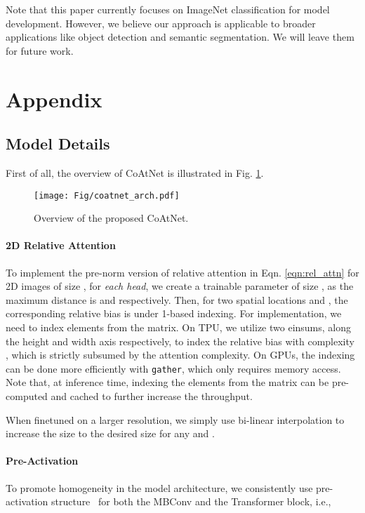 \documentclass{article}
\newcommand{\name}{CoAtNet\xspace}
\begin{document}
Note that this paper currently focuses on ImageNet classification for model development. 
However, we believe our approach is applicable to broader applications like object detection and semantic segmentation.
We will leave them for future work.

\clearpage


\clearpage

\appendix

\section{Appendix}
\label{sec:appendix}

\subsection{Model Details}
\label{sec:appendix_model_detail}
First of all, the overview of \name is illustrated in Fig. \ref{fig:overview}.
\begin{figure}[!ht]
    \centering
    \texttt{[image: Fig/coatnet\_arch.pdf]}
    \caption{Overview of the proposed \name.}
    \label{fig:overview}
\end{figure}
\paragraph{2D Relative Attention} To implement the pre-norm version of relative attention in Eqn. \ref{eqn:rel_attn} for 2D images of size , for \textit{each head}, we create a trainable parameter  of size , as the maximum distance is  and  respectively.
Then, for two spatial locations  and , the corresponding relative bias is  under 1-based indexing.
For implementation, we need to index  elements from the  matrix.
On TPU, we utilize two einsums, along the height and width axis respectively, to index the relative bias with complexity , which is strictly subsumed by the  attention complexity.
On GPUs, the indexing can be done more efficiently with \texttt{gather}, which only requires memory access.
Note that, at inference time, indexing the  elements from the  matrix can be pre-computed and cached to further increase the throughput.

When finetuned on a larger resolution, we simply use bi-linear interpolation to increase the size  to the desired size  for any  and .

\paragraph{Pre-Activation} To promote homogeneity in the model architecture, we consistently use pre-activation structure~\cite{he2016identity} for both the MBConv and the Transformer block, i.e.,
\end{document}
